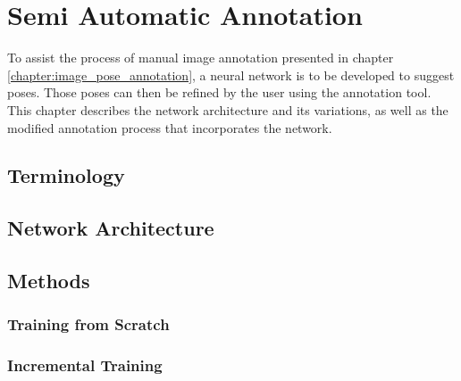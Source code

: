 \chapter{Semi Automatic Annotation} \label{chapter:semi_automatic}

To assist the process of manual image annotation presented in chapter \ref{chapter:image_pose_annotation}, a neural network is to be developed to suggest poses. Those poses can then be refined by the user using the annotation tool. This chapter describes the network architecture and its variations, as well as the modified annotation process that incorporates the network.

\section{Terminology}

\section{Network Architecture}




\section{Methods}



\subsection{Training from Scratch}

\subsection{Incremental Training}